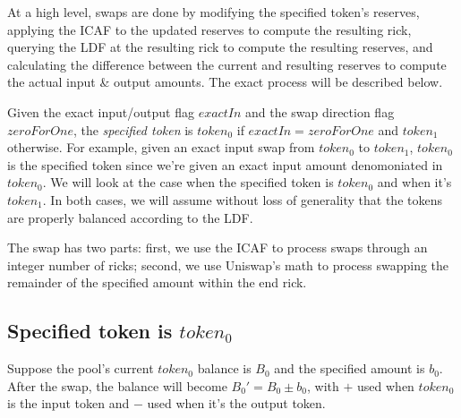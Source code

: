 \documentclass[twocolumn]{article}
\begin{document}
At a high level, swaps are done by modifying the specified token's reserves, applying the ICAF to the updated reserves to compute the resulting rick, querying the LDF at the resulting rick to compute the resulting reserves, and calculating the difference between the current and resulting reserves to compute the actual input \& output amounts. The exact process will be described below.

Given the exact input/output flag $exactIn$ and the swap direction flag $zeroForOne$, the \textit{specified token} is $token_0$ if $exactIn = zeroForOne$ and $token_1$ otherwise. For example, given an exact input swap from $token_0$ to $token_1$, $token_0$ is the specified token since we're given an exact input amount denomoniated in $token_0$. We will look at the case when the specified token is $token_0$ and when it's $token_1$. In both cases, we will assume without loss of generality that the tokens are properly balanced according to the LDF. 

The swap has two parts: first, we use the ICAF to process swaps through an integer number of ricks; second, we use Uniswap's math to process swapping the remainder of the specified amount within the end rick.

\subsection{Specified token is $token_0$} 

Suppose the pool's current $token_0$ balance is $B_0$ and the specified amount is $b_0$. After the swap, the balance will become $B_0' = B_0 \pm b_0$, with $+$ used when $token_0$ is the input token and $-$ used when it's the output token.
\end{document}
